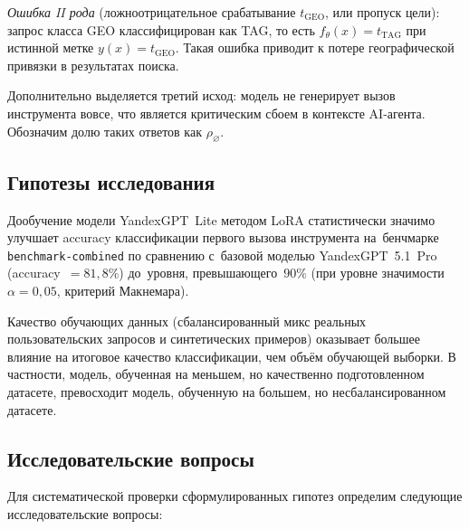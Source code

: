 \begin{definition}
\emph{Ошибка II рода} (ложноотрицательное срабатывание $t_{\mathrm{GEO}}$, или пропуск цели): запрос класса GEO классифицирован как TAG, то есть $f_\theta(x) = t_{\mathrm{TAG}}$ при истинной метке $y(x) = t_{\mathrm{GEO}}$. Такая ошибка приводит к потере географической привязки в результатах поиска.
\end{definition}

Дополнительно выделяется третий исход: модель не генерирует вызов инструмента вовсе, что является критическим сбоем в контексте AI-агента. Обозначим долю таких ответов как $\rho_{\varnothing}$.

\subsection{Гипотезы исследования}

\begin{hypothesis}\label{hyp:lora}
Дообучение модели YandexGPT~Lite методом LoRA статистически значимо улучшает accuracy классификации первого вызова инструмента на~бенчмарке \texttt{benchmark-combined} по сравнению с~базовой моделью YandexGPT~5.1~Pro (accuracy~$= 81{,}8\%$) до~уровня, превышающего~$90\%$ (при уровне значимости $\alpha = 0{,}05$, критерий Макнемара).
\end{hypothesis}

\begin{hypothesis}\label{hyp:data_quality}
Качество обучающих данных (сбалансированный микс реальных пользовательских запросов и синтетических примеров) оказывает большее влияние на итоговое качество классификации, чем объём обучающей выборки. В частности, модель, обученная на меньшем, но качественно подготовленном датасете, превосходит модель, обученную на большем, но несбалансированном датасете.
\end{hypothesis}

\subsection{Исследовательские вопросы}

Для систематической проверки сформулированных гипотез определим следующие исследовательские вопросы:

